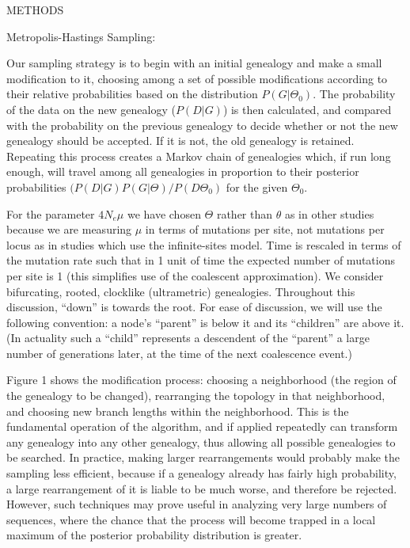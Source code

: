 \documentclass[12pt]{article}
\begin{document}
\bigskip
\begin{center}
METHODS
\bigskip
\end{center}

\begin{bf}
Metropolis-Hastings Sampling:
\end{bf}
Our sampling strategy is to begin with an initial genealogy 
and make a small modification
to it,
choosing among a set of possible modifications according to their
relative probabilities based on the distribution $P(G|\Theta_0)$.
The probability of the data on the new genealogy ($P(D|G)$)
is then calculated, and compared with the probability on the
previous genealogy to decide whether or not the new genealogy should be
accepted.  If it is not, the old genealogy is retained.
  Repeating this process creates a Markov chain of genealogies
which, if run long enough, will travel among all genealogies in
proportion to their posterior probabilities $(P(D|G)P(G|\Theta)/P(D\Theta_0)$ 
for the given $\Theta_{0}$.

For the parameter $4N_e\mu$ we have chosen $\Theta$ rather
than $\theta$ as in other studies because we are measuring $\mu$ in terms
of mutations per site, not mutations per locus as in studies which use the
infinite-sites model.  Time is rescaled in terms of the mutation rate such
that in 1 unit of time the expected number of mutations per site is 1
(this simplifies use of the coalescent approximation).
We consider bifurcating, rooted, clocklike (ultrametric) genealogies.
Throughout this discussion, ``down'' is towards the root.
For ease of discussion, we will use the following convention:  a node's 
``parent'' is below it and its ``children'' are above it.  (In actuality
such a ``child'' represents a descendent of the ``parent'' a large
number of generations later, at the time of the next coalescence event.)

Figure 1 shows the modification process:
choosing a neighborhood (the region of the
genealogy to be changed), rearranging the
topology in that neighborhood, and choosing new branch lengths within the
neighborhood.  This is the fundamental operation of the algorithm, and
if applied repeatedly can transform any genealogy
into any other genealogy, thus allowing all possible genealogies to be
searched.
In practice, making larger rearrangements would probably make the sampling 
less efficient, because if a genealogy already has fairly high probability, a large
rearrangement of it is liable to be much worse, and therefore be
rejected.  However, such techniques may prove useful in analyzing very
large numbers of sequences, where the chance that the process will become
trapped in a local maximum of the posterior probability distribution is greater.
\end{document}
